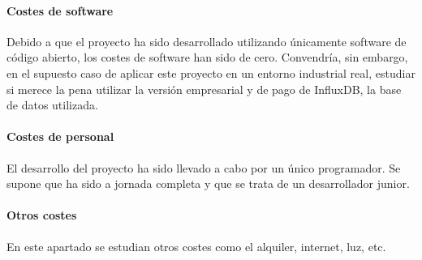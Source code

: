 
\paragraph{Costes de software}
Debido a que el proyecto ha sido desarrollado utilizando únicamente software de código abierto,
los costes de software han sido de cero. Convendría, sin embargo, en el supuesto caso de aplicar
este proyecto en un entorno industrial real, estudiar si merece la pena utilizar la versión empresarial 
y de pago de InfluxDB, la base de datos utilizada.

\paragraph{Costes de personal}

El desarrollo del proyecto ha sido llevado a cabo por un único programador. Se supone que ha sido 
a jornada completa y que se trata de un desarrollador junior.


\paragraph{Otros costes}

En este apartado se estudian otros costes como el alquiler, internet, luz, etc.


